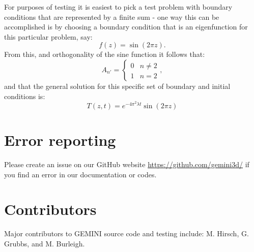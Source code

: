 \documentclass[11pt,letterpaper]{article}
\begin{document}
For purposes of testing it is easiest to pick a test problem with boundary conditions that are represented by a finite sum - one way this can be accomplished is by choosing a boundary condition that is an eigenfunction for this particular problem, say:
\begin{equation}
 f(z) = \sin(2 \pi z).
\end{equation}
From this, and orthogonality of the sine function it follows that:
\begin{equation}
A_{n'} = \left\{ \begin{array}{cc} 0 & n \ne 2 \\ 1 & n=2  \end{array} \right. ,
\end{equation}
and that the general solution for this specific set of boundary and initial conditions is:  
\begin{equation}
T(z,t) = e^{-4 \pi^2 \lambda t} \sin \left( 2 \pi z \right)
\end{equation}



\section{Error reporting}

Please create an issue on our GitHub website \url{https://github.com/gemini3d/} if you find an error in our documentation or codes.  


\section{Contributors}

Major contributors to GEMINI source code and testing include:  M. Hirsch, G. Grubbs, and M. Burleigh.


\pagebreak

%
\end{document}
